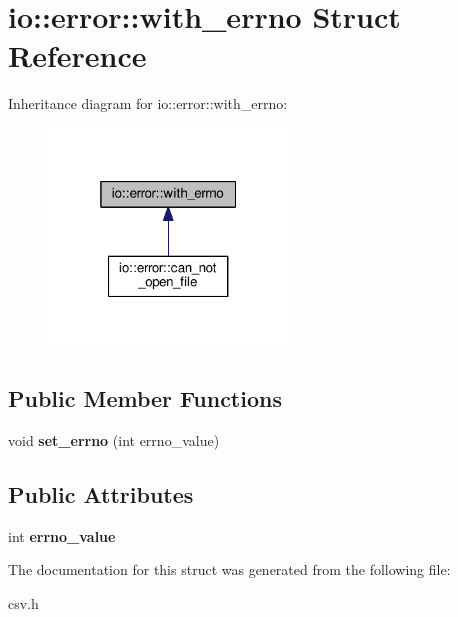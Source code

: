 \section{io\+:\+:error\+:\+:with\+\_\+errno Struct Reference}
\label{structio_1_1error_1_1with__errno}


Inheritance diagram for io\+:\+:error\+:\+:with\+\_\+errno\+:\nopagebreak
\begin{figure}[H]
\begin{center}
\leavevmode
\includegraphics[width=181pt]{structio_1_1error_1_1with__errno__inherit__graph}
\end{center}
\end{figure}
\subsection*{Public Member Functions}
\begin{DoxyCompactItemize}
\item 
void {\bfseries set\+\_\+errno} (int errno\+\_\+value)\label{structio_1_1error_1_1with__errno_a572cfa4b4a96792cd1d17dc9ad2eb5a9}

\end{DoxyCompactItemize}
\subsection*{Public Attributes}
\begin{DoxyCompactItemize}
\item 
int {\bfseries errno\+\_\+value}\label{structio_1_1error_1_1with__errno_a99dcacba02cb53351fe64d7e064406be}

\end{DoxyCompactItemize}


The documentation for this struct was generated from the following file\+:\begin{DoxyCompactItemize}
\item 
csv.\+h\end{DoxyCompactItemize}
